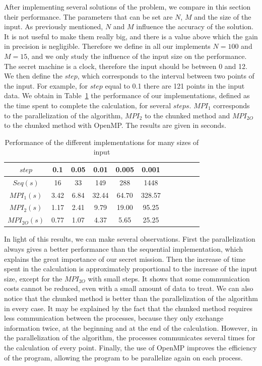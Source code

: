 \documentclass[11pt,a4paper]{article}
\begin{document}
After implementing several solutions of the problem, we compare in this section their performance. The parameters that can be set are $N$, $M$ and the size of the input. As previously mentioned, $N$ and $M$ influence the accuracy of the solution. It is not useful to make them really big, and there is a value above which the gain in precision is negligible. Therefore we define in all our implements $N=100$ and $M=15$, and we only study the influence of the input size on the performance.\\

The secret machine is a clock, therefore the input should be between 0 and 12. We then define the $step$, which corresponds to the interval between two points of the input. For example, for $step$ equal to 0.1 there are 121 points in the input data. We obtain in Table~\ref{table:comparison} the performance of our implementations, defined as the time spent to complete the calculation, for several $steps$. $MPI_1$ corresponds to the parallelization of the algorithm, $MPI_2$ to the chunked method and $MPI_{2O}$ to the chunked method with OpenMP. The results are given in seconds.

\begin{table}[h]
\centering
\begin{tabular}{|c|c|c|c|c|c|c|c|c|c|c|}
  \hline
  $step$ & 0.1 & 0.05 & 0.01 & 0.005 & 0.001\\ 
  \hline
  $Seq(s)$ & 16 & 33 & 149 & 288 & 1448\\
  \hline
   $MPI_1(s)$ & 3.42 & 6.84 & 32.44 & 64.70 & 328.57\\
  \hline
   $MPI_2(s)$ & 1.17 & 2.41 & 9.79 & 19.00 & 95.25\\
  \hline
   $MPI_{2O}(s)$ & 0.77 & 1.07 & 4.37 & 5.65 & 25.25\\
  \hline
  \end{tabular}
\caption{\label{table:comparison} Performance of the different implementations for many sizes of input}
\end{table}

In light of this results, we can make several observations. First the parallelization always gives a better performance than the sequential implementation, which explains the great importance of our secret mission. Then the increase of time spent in the calculation is approximately proportional to the increase of the input size, except for the $MPI_{2O}$ with small steps. It shows that some communication costs cannot be reduced, even with a small amount of data to treat. We can also notice that the chunked method is better than the parallelization of the algorithm in every case. It may be explained by the fact that the chunked method requires less communication between the processes, because they only exchange information twice, at the beginning and at the end of the calculation. However, in the parallelization of the algorithm, the processes communicates several times for the calculation of every point. Finally, the use of OpenMP improves the efficiency of the program, allowing the program to be parallelize again on each process. \\
\end{document}
